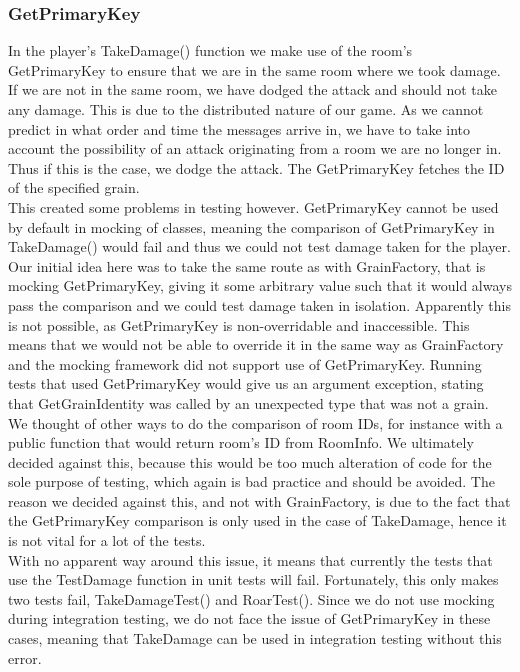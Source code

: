 \subsubsection{GetPrimaryKey}
In the player's TakeDamage() function we make use of the room's GetPrimaryKey to ensure that we are in the same room where we took damage. If we are not in the same room, we have dodged the attack and should not take any damage. This is due to the distributed nature of our game. As we cannot predict in what order and time the messages arrive in, we have to take into account the possibility of an attack originating from a room we are no longer in. Thus if this is the case, we dodge the attack. The GetPrimaryKey fetches the ID of the specified grain. \\
This created some problems in testing however. GetPrimaryKey cannot be used by default in mocking of classes, meaning the comparison of GetPrimaryKey in TakeDamage() would fail and thus we could not test damage taken for the player. \\
Our initial idea here was to take the same route as with GrainFactory, that is mocking GetPrimaryKey, giving it some arbitrary value such that it would always pass the comparison and we could test damage taken in isolation. Apparently this is not possible, as GetPrimaryKey is non-overridable and inaccessible. This means that we would not be able to override it in the same way as GrainFactory and the mocking framework did not support use of GetPrimaryKey. Running tests that used GetPrimaryKey would give us an argument exception, stating that GetGrainIdentity was called by an unexpected type that was not a grain. We thought of other ways to do the comparison of room IDs, for instance with a public function that would return room's ID from RoomInfo. We ultimately decided against this, because this would be too much alteration of code for the sole purpose of testing, which again is bad practice and should be avoided. The reason we decided against this, and not with GrainFactory, is due to the fact that the GetPrimaryKey comparison is only used in the case of TakeDamage, hence it is not vital for a lot of the tests. \\
With no apparent way around this issue, it means that currently the tests that use the TestDamage function in unit tests will fail. Fortunately, this only makes two tests fail, TakeDamageTest() and RoarTest(). Since we do not use mocking during integration testing, we do not face the issue of GetPrimaryKey in these cases, meaning that TakeDamage can be used in integration testing without this error. 
